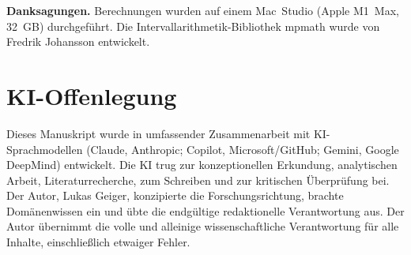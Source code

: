 \documentclass[12pt,a4paper]{article}
\theoremstyle{definition}
\theoremstyle{remark}
\begin{document}
\bigskip
\noindent\textbf{Danksagungen.} Berechnungen wurden auf einem
Mac~Studio (Apple M1~Max, 32~GB) durchgeführt. Die
Intervallarithmetik-Bibliothek mpmath wurde von Fredrik Johansson
entwickelt.


\section*{KI-Offenlegung}

Dieses Manuskript wurde in umfassender Zusammenarbeit mit
KI-Sprachmodellen (Claude, Anthropic; Copilot, Microsoft/GitHub; Gemini,
Google DeepMind) entwickelt. Die KI trug zur konzeptionellen Erkundung,
analytischen Arbeit, Literaturrecherche, zum Schreiben und zur
kritischen Überprüfung bei. Der Autor, Lukas Geiger, konzipierte die
Forschungsrichtung, brachte Domänenwissen ein und übte die endgültige
redaktionelle Verantwortung aus. Der Autor übernimmt die volle und
alleinige wissenschaftliche Verantwortung für alle Inhalte,
einschließlich etwaiger Fehler.




\end{document}
